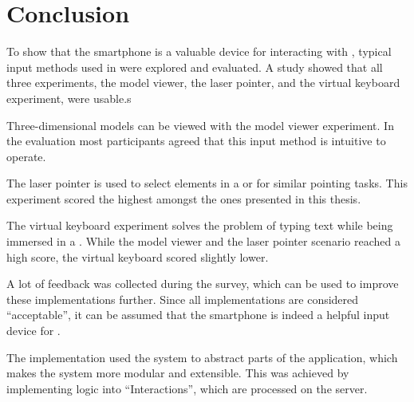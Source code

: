 \chapter{Conclusion}\label{chapter:conclusion}

To show that the smartphone is a valuable device for interacting with , typical input methods used in  were explored and evaluated. A  study showed that all three experiments, the model viewer, the laser pointer, and the virtual keyboard experiment, were usable.s

Three-dimensional models can be viewed with the model viewer experiment. In the evaluation most participants agreed that this input method is intuitive to operate.

The laser pointer is used to select elements in a  or for similar pointing tasks. This experiment scored the highest amongst the ones presented in this thesis. 

The virtual keyboard experiment solves the problem of typing text while being immersed in a . While the model viewer and the laser pointer scenario reached a high score, the virtual keyboard scored slightly lower. 

A lot of feedback was collected during the survey, which can be used to improve these implementations further. Since all implementations are considered \enquote{acceptable}, it can be assumed that the smartphone is indeed a helpful input device for .

The implementation used the  system to abstract parts of the application, which makes the system more modular and extensible. This was achieved by implementing logic into \enquote{Interactions}, which are processed on the server. 